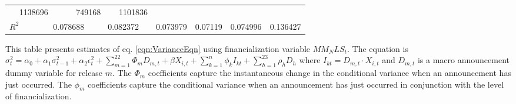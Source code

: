\begin{sidewaystable}
{\begin{tabular}{@{}lllllllllllll@{}}
\multicolumn{2}{c}{ 1138696 }                                                 & \multicolumn{2}{c}{ 749168 }                                                   & \multicolumn{2}{c}{ 1101836 }                                                 \\ \textbf{$R^2$}             &\multicolumn{2}{c}{ 0.078688 }                                                 & \multicolumn{2}{c}{ 0.082372 }                                                 & \multicolumn{2}{c}{ 0.073979 }                                                 & \multicolumn{2}{c}{ 0.07119 }                                                 & \multicolumn{2}{c}{ 0.074996 }                                                   & \multicolumn{2}{c}{ 0.136427 }                                                 \\ \bottomrule 
\end{tabular}
}
\begin{tablenotes}\item 
        \singlespacing
        \footnotesize
        This table presents estimates of eq. \ref{eqn:VarianceEqn} using financialization variable $MM_NLS_t$. The equation is $\sigma_{t}^2=\alpha_0+\alpha_1 \sigma_{t-1}^2+\alpha_2 \epsilon_t^2 +\sum_{m=1}^{22} \Phi_m D_{m,t}+\beta X_{i,t}+\sum_{k=1}^n \phi_k I_{kt} + \sum_{h=1}^{23} \rho_h D_h$ where $I_{kt}=D_{m,t} \cdot X_{i,t}$ and $D_{m,t}$ is a macro announcement dummy variable for release $m$. The $\Phi_m$ coefficients capture the instantaneous change in the conditional variance when an announcement has just occurred. The $\phi_m$ coefficients capture the conditional variance when an announcement has just occurred in conjunction with the level of financialization.
\end{tablenotes}
\end{sidewaystable}





 

